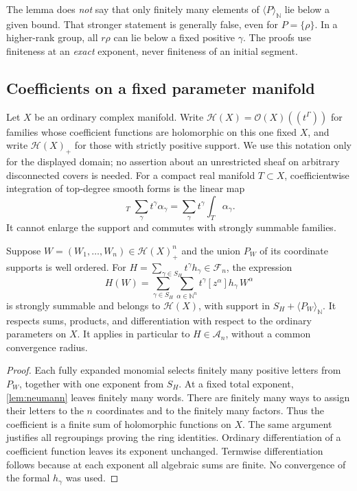 \documentclass[11pt,letterpaper]{article}
\theoremstyle{definition}
\theoremstyle{remark}
\newcommand{\N}{\mathbb N}\newcommand{\Z}{\mathbb Z}\newcommand{\Q}{\mathbb Q}
\newcommand{\OO}{\mathcal O}\newcommand{\Agerm}{\mathscr A}
\newcommand{\HH}{\mathscr H}\newcommand{\FF}{\mathscr F}
\newcommand{\HInt}{\mathop{\int^{\!H}}\nolimits}
\newcommand{\powers}[1]{\langle #1\rangle_{\N}}
\numberwithin{equation}{section}
\begin{document}
\begin{remark}\label{rem:notcofinal}
The lemma does \emph{not} say that only finitely many elements of
$\powers P$ lie below a given bound. That stronger statement is generally
false, even for $P=\{\rho\}$. In a higher-rank group, all $r\rho$ can lie
below a fixed positive $\gamma$. The proofs use finiteness at an \emph{exact}
exponent, never finiteness of an initial segment.
\end{remark}

\subsection{Coefficients on a fixed parameter manifold}
Let $X$ be an ordinary complex manifold. Write
$\HH(X)=\OO(X)((t^\Gamma))$ for families whose coefficient functions are
holomorphic on this one fixed $X$, and write $\HH(X)_+$ for those with
strictly positive support. We use this notation only for the displayed domain;
no assertion about an unrestricted sheaf on arbitrary disconnected covers is
needed. For a compact real manifold $T\subset X$, coefficientwise integration
of top-degree smooth forms is the linear map
\begin{equation}\label{eq:Hint}
 \HInt_T\sum_{\gamma}t^\gamma\alpha_\gamma
 =\sum_\gamma t^\gamma\int_T\alpha_\gamma.
\end{equation}
It cannot enlarge the support and commutes with strongly summable families.

\begin{lemma}\label{lem:substitution}
Suppose $W=(W_1,\ldots,W_n)\in\HH(X)_+^n$ and the union $P_W$ of its
coordinate supports is well ordered. For
$H=\sum_{\gamma\in S_H}t^\gamma h_\gamma\in\FF_n$, the expression
\begin{equation}\label{eq:substitution}
 H(W)=\sum_{\gamma\in S_H}\sum_{\alpha\in\N^n}
 t^\gamma [z^\alpha]h_\gamma\,W^\alpha
\end{equation}
is strongly summable and belongs to $\HH(X)$, with support in
$S_H+\powers{P_W}$. It respects sums, products, and differentiation with
respect to the ordinary parameters on $X$. It applies in particular to
$H\in\Agerm_n$, without a common convergence radius.
\end{lemma}
\begin{proof}
Each fully expanded monomial selects finitely many positive letters from
$P_W$, together with one exponent from $S_H$. At a fixed total exponent,
\cref{lem:neumann} leaves finitely many words. There are finitely many ways to
assign their letters to the $n$ coordinates and to the finitely many factors.
Thus the coefficient is a finite sum of holomorphic functions on $X$.
The same argument justifies all regroupings proving the ring identities.
Ordinary differentiation of a coefficient function leaves its exponent
unchanged. Termwise differentiation follows because at each exponent all
algebraic sums are finite. No convergence of the formal $h_\gamma$ was used.
\end{proof}
\end{document}
